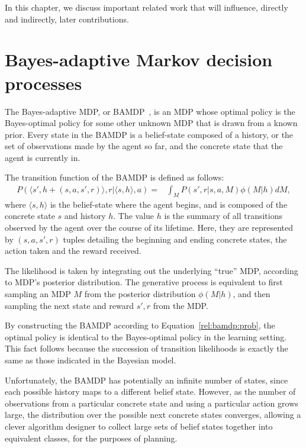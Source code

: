 
In this chapter, we discuss important related work that will influence, directly and indirectly, later contributions. 



\section{Bayes-adaptive Markov decision processes}

The Bayes-adaptive MDP, or BAMDP~\cite{duff03}, is an MDP whose optimal policy is the Bayes-optimal policy for some other unknown MDP that is drawn from a known prior. Every state in the BAMDP is a belief-state composed of a history, or the set of observations made by the agent so far, and the concrete state that the agent is currently in.

The transition function of the BAMDP is defined as follows:
\begin{eqnarray}
\label{rel:bamdp:prob}
P(\langle s', h + (s,a,s',r)\rangle, r | \langle s, h\rangle, a) =& \int_M P(s', r | s, a, M)\phi(M|h) dM,
\end{eqnarray}
where $\langle s, h\rangle$ is the belief-state where the agent begins, and is composed of the concrete state $s$ and history $h$. The value $h$ is the summary of all transitions observed by the agent over the course of its lifetime. Here, they are represented by $(s, a, s',r)$ tuples detailing the beginning and ending concrete states, the action taken and the reward received.

The likelihood  is taken by integrating out the underlying ``true'' MDP, according to MDP's posterior distribution. The generative process  is equivalent to first sampling an MDP $M$ from the posterior distribution $\phi(M|h)$, and then sampling the next state and reward $s', r$ from the MDP.

By constructing the BAMDP according to Equation~\ref{rel:bamdp:prob}, the optimal policy is identical to the Bayes-optimal policy in the learning setting. This fact follows because the succession of transition likelihoods is exactly the same as those indicated in the Bayesian model. 

Unfortunately, the BAMDP has potentially an infinite number of states, since each possible history maps to a different belief state. However, as the number of observations from a particular concrete state and using a particular action grows large, the distribution over the possible next concrete states converges, allowing a clever algorithm designer to collect large sets of belief states together into equivalent classes, for the purposes of planning. 




